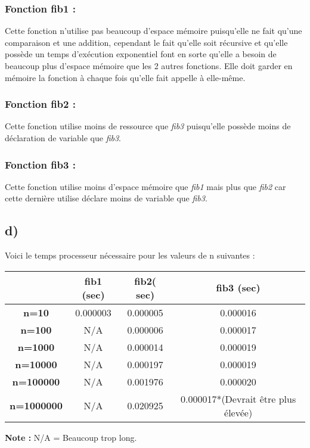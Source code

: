 \documentclass[12pt]{article}
\begin{document}
	  \subsubsection*{Fonction fib1 :}      
      \noindent Cette fonction n'utilise pas beaucoup d'espace mémoire puisqu'elle ne fait qu'une comparaison et une addition, cependant le fait qu'elle soit récursive et qu'elle possède un temps d'exécution exponentiel font en sorte qu'elle a besoin de beaucoup plus d'espace mémoire que les 2 autres fonctions. Elle doit garder en mémoire la fonction à chaque fois qu'elle fait appelle à elle-même.
      \subsubsection*{Fonction fib2 :} 
      \noindent Cette fonction utilise moins de ressource que \textit{fib3} puisqu'elle possède moins de déclaration de variable que \textit{fib3}.
      \subsubsection*{Fonction fib3 :}
      \noindent Cette fonction utilise moins d'espace mémoire que \textit{fib1} mais plus que \textit{fib2} car cette dernière utilise déclare moins de variable que \textit{fib3}.
    \subsection*{d)}
      \noindent Voici le temps processeur nécessaire pour les valeurs de n suivantes :     
      \begin{table}[h]
      	\centering
        \begin{tabular}{|c|c|c|c|}
          \hline
          & \textbf{fib1 (sec)} & \textbf{fib2( sec)} & \textbf{fib3 (sec)} \\ \hline
          \textbf{n=10}      & 0.000003            & 0.000005            & 0.000016            \\ \hline
          \textbf{n=100}     & N/A                 & 0.000006            & 0.000017            \\ \hline
          \textbf{n=1000}    & N/A                 & 0.000014            & 0.000019            \\ \hline
          \textbf{n=10000}   & N/A                 & 0.000197            & 0.000019            \\ \hline
          \textbf{n=100000}  & N/A                 & 0.001976            & 0.000020            \\ \hline
          \textbf{n=1000000} & N/A                 & 0.020925            & 0.000017*(Devrait être plus élevée)            \\ \hline
        \end{tabular}
      \end{table}
      \newline
      \textbf{Note :} N/A = Beaucoup trop long.
\end{document}
